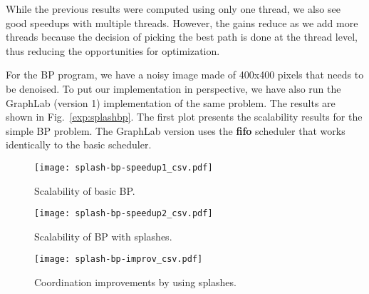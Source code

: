 \begin{table*}[ht]

\begin{center}
\end{center}
     \caption{Summarized information about the datasets used in the SSSP program.}
     \label{tbl:shortest_path_speedup}
\end{table*}

While the previous results were computed using only one thread, we also see good speedups with multiple threads. However, the gains reduce as we add
more threads because the decision of picking the best path is done at the thread level, thus reducing the opportunities for optimization.

For the BP program, we have a noisy image made of 400x400 pixels that needs to be denoised.
To put our implementation in perspective, we have also run the GraphLab (version 1) implementation of the same problem. The results are shown
in Fig.~\ref{exp:splashbp}. The first plot presents the scalability results for the simple BP problem. The GraphLab version
uses the \textbf{fifo} scheduler that works identically to the basic \lang scheduler.

\begin{figure*}[ht]
   \centering
   \begin{subfigure}[b]{0.3\textwidth}
      \texttt{[image: splash-bp-speedup1\_csv.pdf]}
      \caption{Scalability of basic BP.\newline}
   \end{subfigure}
   \begin{subfigure}[b]{0.3\textwidth}
      \texttt{[image: splash-bp-speedup2\_csv.pdf]}
      \caption{Scalability of BP with splashes.}
   \end{subfigure}
   \begin{subfigure}[b]{0.3\textwidth}
      \texttt{[image: splash-bp-improv\_csv.pdf]}
      \caption{Coordination improvements by using splashes.}
   \end{subfigure}
   \caption{Experimental results for BP with coordination using splashes. The dataset is a 400x400 image.}
   \label{exp:splashbp}
\end{figure*}

